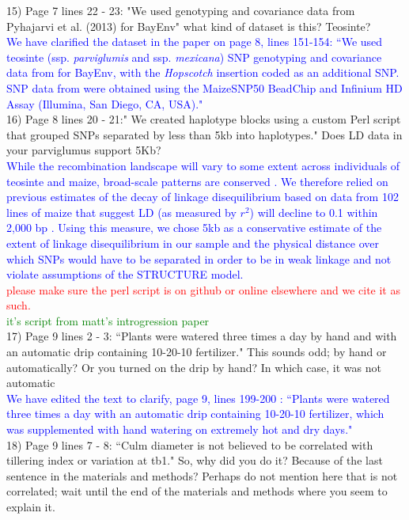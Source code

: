 \documentclass[11pt]{article}
\newcommand{\res}[1]{\noindent \textcolor{blue}{{#1}} \\}
\newcommand{\jri}[1]{\noindent \textcolor{red}{{#1}} \\}
\newcommand{\lev}[1]{\noindent \textcolor{green}{{#1}} \\}
\begin{document}
15) Page 7 lines 22 - 23: "We used genotyping and covariance data from Pyhajarvi et al. (2013) for BayEnv" what kind of dataset is this? Teosinte?\\ 

\res{We have clarified the dataset in the paper on page 8, lines 151-154: ``We used teosinte (ssp. \emph{parviglumis} and ssp. \emph{mexicana}) SNP genotyping and covariance data from \citet{Pyhajarvi2013} for BayEnv, with the \emph{Hopscotch} insertion coded as an additional SNP. SNP data from \citet{Pyhajarvi2013} were obtained using the MaizeSNP50 BeadChip and Infinium HD Assay (Illumina, San Diego, CA, USA)."}

16) Page 8 lines 20 - 21:" We created haplotype blocks using a custom Perl script that grouped SNPs separated by less than 5kb into haplotypes." Does LD data in your parviglumus support 5Kb?\\ 

\res{While the recombination landscape will vary to some extent across individuals of teosinte and maize, broad-scale patterns are conserved \citep{bauer2013}.  We therefore relied on previous estimates of the decay of linkage disequilibrium based on data from 102 lines of maize that suggest LD (as measured by $r^2$) will decline to 0.1 within 2,000 bp \citep{Remington2001}.  Using this measure, we chose 5kb as a conservative estimate of the extent of linkage disequilibrium in our sample and the physical distance over which SNPs would have to be separated in order to be in weak linkage and not violate assumptions of the STRUCTURE model.}

\jri{please make sure the perl script is on github or online elsewhere and we cite it as such.}
\lev{it's script from matt's introgression paper}

17) Page 9 lines 2 - 3: ``Plants were watered three times a day by hand and with an automatic drip containing 10-20-10 fertilizer." This sounds odd; by hand or automatically? Or you turned on the drip by hand? In which case, it was not automatic\\

\res{We have edited the text to clarify, page 9, lines 199-200 : ``Plants were watered three times a day with an automatic drip containing 10-20-10 fertilizer, which was supplemented with hand watering on extremely hot and dry days."}

18) Page 9 lines 7 - 8: ``Culm diameter is not believed to be correlated with tillering index or variation at tb1." So, why did you do it? Because of the last sentence in the materials and methods? Perhaps do not mention here that is not correlated; wait until the end of the materials and methods where you seem to explain it.\\ 
\end{document}
